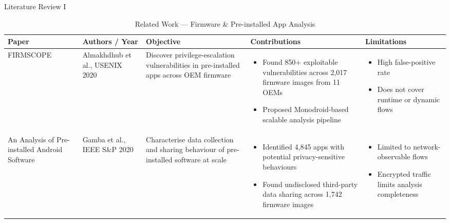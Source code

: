 \documentclass[aspectratio=169]{beamer}
\begin{document}
\begin{frame}{Literature Review I}
\begin{table}[ht]
    \centering
    \caption{Related Work — Firmware \& Pre-installed App Analysis}
    \tiny
    \begin{tabular}{|p{0.6in}|p{0.65in}|p{1.0in}|p{1.3in}|p{1.3in}|}
    \hline
    \textbf{Paper} & \textbf{Authors / Year} & \textbf{Objective} &
    \textbf{Contributions} & \textbf{Limitations} \\
    \hline
    \vspace{1mm}
    FIRMSCOPE &
    Almakhdhub et al., USENIX 2020 &
    Discover privilege-escalation vulnerabilities in pre-installed apps across OEM firmware &
    \begin{itemize}
        \item Found 850+ exploitable vulnerabilities across 2,017 firmware images from 11 OEMs
        \item Proposed Monodroid-based scalable analysis pipeline
    \end{itemize} &
    \begin{itemize}
        \item High false-positive rate
        \item Does not cover runtime or dynamic flows
    \end{itemize} \\
    \hline
    \vspace{1mm}
    An Analysis of Pre-installed Android Software &
    Gamba et al., IEEE S\&P 2020 &
    Characterise data collection and sharing behaviour of pre-installed software at scale &
    \begin{itemize}
        \item Identified 4,845 apps with potential privacy-sensitive behaviours
        \item Found undisclosed third-party data sharing across 1,742 firmware images
    \end{itemize} &
    \begin{itemize}
        \item Limited to network-observable flows
        \item Encrypted traffic limits analysis completeness
    \end{itemize} \\
    \hline
    \end{tabular}
\end{table}
\end{frame}
\end{document}
